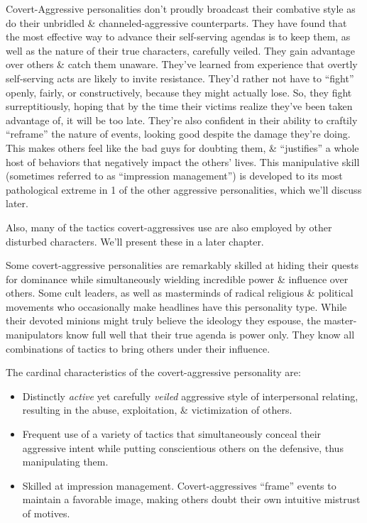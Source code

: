\documentclass{article}
\numberwithin{equation}{section}
\begin{document}
Covert-Aggressive personalities don't proudly broadcast their combative style as do their unbridled \& channeled-aggressive counterparts. They have found that the most effective way to advance their self-serving agendas is to keep them, as well as the nature of their true characters, carefully veiled. They gain advantage over others \& catch them unaware. They've learned from experience that overtly self-serving acts are likely to invite resistance. They'd rather not have to ``fight'' openly, fairly, or constructively, because they might actually lose. So, they fight surreptitiously, hoping that by the time their victims realize they've been taken advantage of, it will be too late. They're also confident in their ability to craftily ``reframe'' the nature of events, looking good despite the damage they're doing. This makes others feel like the bad guys for doubting them, \& ``justifies'' a whole host of behaviors that negatively impact the others' lives. This manipulative skill (sometimes referred to as ``impression management'') is developed to its most pathological extreme in 1 of the other aggressive personalities, which we'll discuss later.

Also, many of the tactics covert-aggressives use are also employed by other disturbed characters. We'll present these in a later chapter.

Some covert-aggressive personalities are remarkably skilled at hiding their quests for dominance while simultaneously wielding incredible power \& influence over others. Some cult leaders, as well as masterminds of radical religious \& political movements who occasionally make headlines have this personality type. While their devoted minions might truly believe the ideology they espouse, the master-manipulators know full well that their true agenda is power only. They know all combinations of tactics to bring others under their influence.

The cardinal characteristics of the covert-aggressive personality are:
\begin{itemize}
	\item Distinctly \textit{active} yet carefully \textit{veiled} aggressive style of interpersonal relating, resulting in the abuse, exploitation, \& victimization of others.
	\item Frequent use of a variety of tactics that simultaneously conceal their aggressive intent while putting conscientious others on the defensive, thus manipulating them.
	\item Skilled at impression management. Covert-aggressives ``frame'' events to maintain a favorable image, making others doubt their own intuitive mistrust of motives.
\end{itemize}
\end{document}
